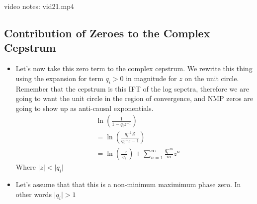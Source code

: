 video notes: vid21.mp4
\subsection*{Contribution of Zeroes to the Complex Cepstrum}
\begin{itemize}
\item{Let's now take this zero term to the complex cepstrum. We rewrite this thing
using the expansion for term $q_i > 0$ in magnitude for $z$ on the unit circle. 
Remember that the cepstrum is this IFT of the log sepctra, therefore we are 
going to want the unit circle in the region of convergence, and NMP zeros
are going to show up as anti-causal exponentials. 
\begin{align*}
&\ln(\frac{1}{1 - q_i z^{-1}}) \\
&= \ln(\frac{q_i^{-1}Z}{q_i^{-1}z - 1}) \\
&= \ln(\frac{-z}{q_i}) + \sum\limits_{n = 1}^{\infty} \frac{ q_i^{-m} }{ m }z^{n}
\end{align*}
Where $\vert z \vert < \vert q_i \vert $
}
\item{
Let's assume that that this is a non-minimum maximimum phase zero. In other words
$\vert q_i \vert > 1$
}
\end{itemize}
